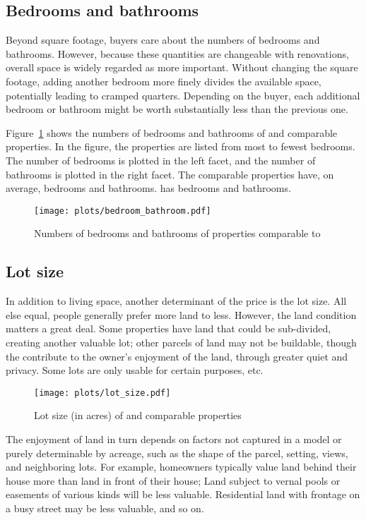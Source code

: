 \documentclass[
12pt, %
letterpaper, %
oneside, %
headinclude,footinclude, %
BCOR5mm, %
]{scrartcl}
\begin{document}
\subsection{Bedrooms and bathrooms}
Beyond square footage, buyers care about the numbers of bedrooms and bathrooms.
However, because these quantities are changeable with renovations, overall space is widely regarded as more important.
Without changing the square footage, adding another bedroom more finely divides the available space, potentially leading to cramped quarters. 
Depending on the buyer, each additional bedroom or bathroom might be worth substantially less than the previous one.

Figure~\ref{fig:bedroom_bathroom} shows the numbers of bedrooms and bathrooms of \PropertyName{} and comparable properties. 
In the figure, the properties are listed from most to fewest bedrooms.
The number of bedrooms is plotted in the left facet, and the number of bathrooms is plotted in the right facet. 
The comparable properties have, on average, \AverageBedrooms{} bedrooms and \AverageBaths{} bathrooms.
\PropertyName{} has bedrooms \NumberOfBedrooms{} and \NumberOfBaths{} bathrooms.

\begin{figure}[!]
\centering
\caption{Numbers of bedrooms and bathrooms of properties comparable to \PropertyName{}} \label{fig:bedroom_bathroom}  
\texttt{[image: plots/bedroom\_bathroom.pdf]} 
\end{figure}

\subsection{Lot size}
In addition to living space, another determinant of the price is the lot size.
All else equal, people generally prefer more land to less.
However, the land condition matters a great deal. Some properties have land that could be sub-divided, creating another valuable lot; other parcels of land may not be buildable, though the contribute to the owner’s enjoyment of the land, through greater quiet
and privacy. Some lots are only usable for certain purposes, etc.

\begin{figure}[!]
\centering
\caption{Lot size (in acres) of \PropertyName{} and comparable properties} \label{fig:lot_size}  
\texttt{[image: plots/lot\_size.pdf]} 
\end{figure}

The enjoyment of land in turn depends on factors not captured in a model or purely determinable by acreage, such as the shape of the parcel, setting, views, and neighboring lots.
For example, homeowners typically value land behind their house more than land in front of their house; 
Land subject to vernal pools or easements of various kinds will be less valuable.
Residential land with frontage on a busy street may be less valuable, and so on.
\end{document}
